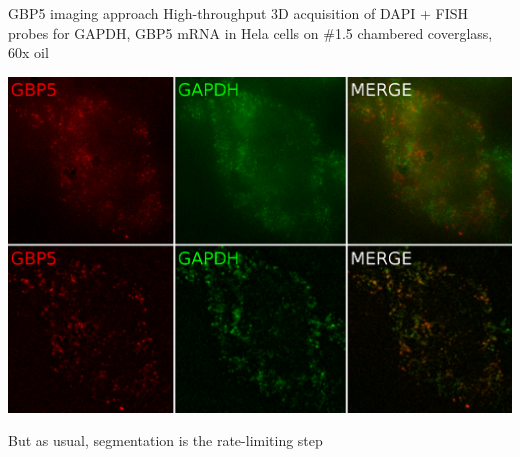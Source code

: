 \documentclass{beamer}					%
\begin{document}
\begin{frame}{GBP5 imaging approach}
High-throughput 3D acquisition of DAPI + FISH probes for GAPDH, GBP5 mRNA in Hela cells on \#1.5 chambered coverglass, 60x oil

\begin{center}
\includegraphics[width=1\textwidth]{Stains.png}
\end{center}

But as usual, segmentation is the rate-limiting step
\end{frame}
\end{document}
